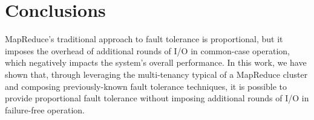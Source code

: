 \section{Conclusions}

MapReduce's traditional approach to fault tolerance is proportional, but it
imposes the overhead of additional rounds of I/O in common-case operation,
which negatively impacts the system's overall performance. In this work, we
have shown that, through leveraging the multi-tenancy typical of a MapReduce
cluster and composing previously-known fault tolerance techniques, it is
possible to provide proportional fault tolerance without imposing additional
rounds of I/O in failure-free operation.
